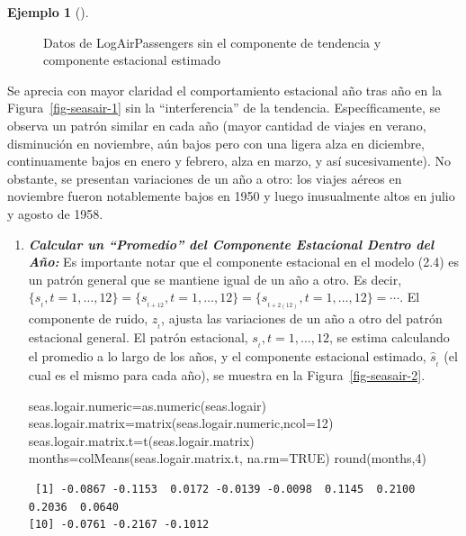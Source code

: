 \documentclass[
  us-letterpaper,
]{scrreprt}
\newenvironment{Shaded}{\begin{snugshade}}{\end{snugshade}}
\newcommand{\AttributeTok}[1]{\textcolor[rgb]{0.40,0.45,0.13}{#1}}
\newcommand{\ConstantTok}[1]{\textcolor[rgb]{0.56,0.35,0.01}{#1}}
\newcommand{\DecValTok}[1]{\textcolor[rgb]{0.68,0.00,0.00}{#1}}
\newcommand{\FunctionTok}[1]{\textcolor[rgb]{0.28,0.35,0.67}{#1}}
\newcommand{\NormalTok}[1]{\textcolor[rgb]{0.00,0.23,0.31}{#1}}
\newcommand{\OtherTok}[1]{\textcolor[rgb]{0.00,0.23,0.31}{#1}}
\theoremstyle{definition}
\newtheorem{example}{Ejemplo}[chapter]
\theoremstyle{plain}
\theoremstyle{plain}
\theoremstyle{definition}
\theoremstyle{remark}
\begin{document}
\begin{example}[]
\begin{tcolorbox}
\begin{figure}[H]
\caption{\label{fig-seasair}Datos de LogAirPassengers sin el componente
de tendencia y componente estacional estimado}

\end{figure}%

Se aprecia con mayor claridad el comportamiento estacional año tras año
en la Figura~\ref{fig-seasair-1} sin la ``interferencia'' de la
tendencia. Específicamente, se observa un patrón similar en cada año
(mayor cantidad de viajes en verano, disminución en noviembre, aún bajos
pero con una ligera alza en diciembre, continuamente bajos en enero y
febrero, alza en marzo, y así sucesivamente). No obstante, se presentan
variaciones de un año a otro: los viajes aéreos en noviembre fueron
notablemente bajos en 1950 y luego inusualmente altos en julio y agosto
de 1958.

\begin{enumerate}
\def\labelenumi{\alph{enumi}.}
\setcounter{enumi}{2}
\item
  \textbf{\emph{Calcular un ``Promedio'' del Componente Estacional
  Dentro del Año:}} Es importante notar que el componente estacional en
  el modelo (2.4) es un patrón general que se mantiene igual de un año a
  otro. Es
  decir,\(\{s_{_t}, t=1,\ldots,12\} = \{s_{_{t+12}},t=1,\ldots,12\} =\{s_{_{t+2(12)}}, t=1,\ldots,12\}=\cdots.\)
  El componente de ruido, \(z_{_t}\), ajusta las variaciones de un año a
  otro del patrón estacional general. El patrón estacional,
  \(s_{_t}, t=1,\ldots,12\), se estima calculando el promedio a lo largo
  de los años, y el componente estacional estimado, \(\hat{s}_{_t}\) (el
  cual es el mismo para cada año), se muestra en la
  Figura~\ref{fig-seasair-2}.

\begin{Shaded}
\begin{Highlighting}[]
\NormalTok{seas.logair.numeric}\OtherTok{=}\FunctionTok{as.numeric}\NormalTok{(seas.logair)}
\NormalTok{seas.logair.matrix}\OtherTok{=}\FunctionTok{matrix}\NormalTok{(seas.logair.numeric,}\AttributeTok{ncol=}\DecValTok{12}\NormalTok{)}
\NormalTok{seas.logair.matrix.t}\OtherTok{=}\FunctionTok{t}\NormalTok{(seas.logair.matrix)}
\NormalTok{months}\OtherTok{=}\FunctionTok{colMeans}\NormalTok{(seas.logair.matrix.t, }\AttributeTok{na.rm=}\ConstantTok{TRUE}\NormalTok{)}
\FunctionTok{round}\NormalTok{(months,}\DecValTok{4}\NormalTok{)}
\end{Highlighting}
\end{Shaded}

\begin{verbatim}
 [1] -0.0867 -0.1153  0.0172 -0.0139 -0.0098  0.1145  0.2100  0.2036  0.0640
[10] -0.0761 -0.2167 -0.1012
\end{verbatim}


\end{enumerate}
\end{tcolorbox}
\end{example}
\end{document}
